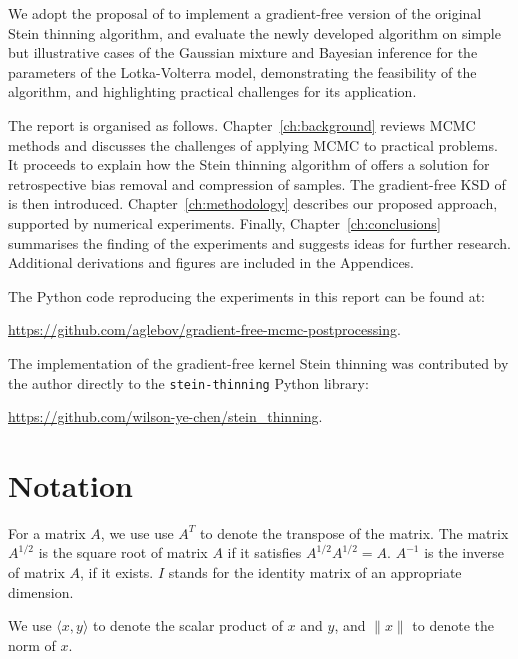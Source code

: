 \documentclass[11pt,a4paper]{report}
\begin{document}
We adopt the proposal of \cite{fisherGradientFreeKernelStein2024} to implement a gradient-free version of the original Stein thinning algorithm, and evaluate the newly developed algorithm on simple but illustrative cases of the Gaussian mixture and Bayesian inference for the parameters of the Lotka-Volterra model, demonstrating the feasibility of the algorithm, and highlighting practical challenges for its application.

The report is organised as follows. Chapter~\ref{ch:background} reviews MCMC methods and discusses the challenges of applying MCMC to practical problems. It proceeds to explain how the Stein thinning algorithm of \cite{riabizOptimalThinningMCMC2022} offers a solution for retrospective bias removal and compression of samples. The gradient-free KSD of \cite{fisherGradientFreeKernelStein2024} is then introduced. Chapter~\ref{ch:methodology} describes our proposed approach, supported by numerical experiments. Finally, Chapter~\ref{ch:conclusions} summarises the finding of the experiments and suggests ideas for further research. Additional derivations and figures are included in the Appendices.

The Python code reproducing the experiments in this report can be found at:
\begin{center}
\vspace{-10pt}
\url{https://github.com/aglebov/gradient-free-mcmc-postprocessing}.
\vspace{-10pt}
\end{center}
The implementation of the gradient-free kernel Stein thinning was contributed by the author directly to the \texttt{stein-thinning} Python library:
\begin{center}
\vspace{-10pt}
\url{https://github.com/wilson-ye-chen/stein_thinning}.
\end{center}

\chapter*{Notation}

For a matrix $A$, we use use $A^T$ to denote the transpose of the matrix. The matrix $A^{1/2}$ is the square root of matrix $A$ if it satisfies $A^{1/2} A^{1/2} = A$. $A^{-1}$ is the inverse of matrix $A$, if it exists. $I$ stands for the identity matrix of an appropriate dimension.

We use $\langle x, y \rangle$ to denote the scalar product of $x$ and $y$, and $\| x \|$ to denote the norm of $x$.
\end{document}
